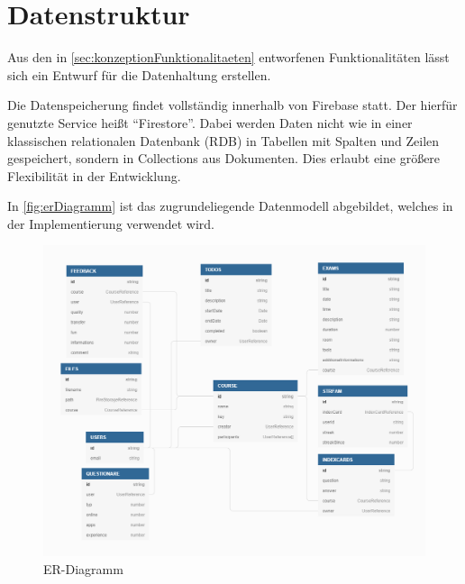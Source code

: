\section{Datenstruktur}
Aus den in \autoref{sec:konzeptionFunktionalitaeten} entworfenen Funktionalitäten lässt sich ein Entwurf für die Datenhaltung erstellen.

Die Datenspeicherung findet vollständig innerhalb von Firebase statt.
Der hierfür genutzte Service heißt \enquote{Firestore}.
Dabei werden Daten nicht wie in einer klassischen relationalen Datenbank (\ac{RDB}) in Tabellen mit Spalten und Zeilen gespeichert, sondern in Collections aus Dokumenten. Dies erlaubt eine größere Flexibilität in der Entwicklung.


In \autoref{fig:erDiagramm} ist das zugrundeliegende Datenmodell abgebildet, welches in der Implementierung verwendet wird.

\begin{figure}[ht!] %
    \begin{center}
        \includegraphics[width=\textwidth]{img/Integrationsseminar ER.png}
        \caption{ER-Diagramm}
        \label{fig:erDiagramm}
    \end{center}
\end{figure}





